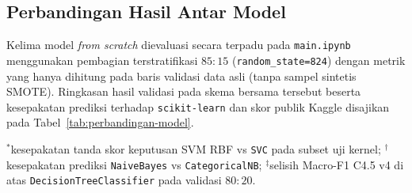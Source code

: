 

\clearpage




\subsection{Perbandingan Hasil Antar Model}

Kelima model \textit{from scratch} dievaluasi secara terpadu pada \texttt{main.ipynb}
menggunakan pembagian terstratifikasi $85:15$ (\texttt{random\_state=824}) dengan metrik yang
hanya dihitung pada baris validasi data asli (tanpa sampel sintetis SMOTE). Ringkasan hasil
validasi pada skema bersama tersebut beserta kesepakatan prediksi terhadap \texttt{scikit-learn}
dan skor publik Kaggle disajikan pada Tabel~\ref{tab:perbandingan-model}.

\begin{table}[htbp]
  \centering
  \caption{Ringkasan performa kelima model \textit{from scratch} pada validasi $85:15$
  (\texttt{random\_state=824}), kesepakatan dengan \texttt{scikit-learn}, dan skor publik Kaggle.}
  \label{tab:perbandingan-model}
  \footnotesize
  \par\vspace{2pt}
  {\scriptsize $^{*}$kesepakatan tanda skor keputusan SVM RBF vs \texttt{SVC} pada subset uji kernel;
  $^{\dagger}$kesepakatan prediksi \texttt{NaiveBayes} vs \texttt{CategoricalNB};
  $^{\ddagger}$selisih Macro-F1 C4.5 v4 di atas \texttt{DecisionTreeClassifier} pada validasi $80:20$.}
\end{table}

